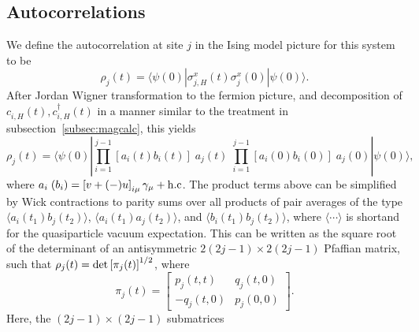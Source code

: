 \documentclass[a4paper,10pt]{article}
\begin{document}
\subsection{Autocorrelations}
\label{subsec:corrcalc}
We define the autocorrelation at site $j$ in the Ising model picture for this system to be
\begin{equation}
\label{eq:corrdef}
\rho_j(t) = \langle \psi(0) | \sigma^x_{j,H} (t) \sigma^x_{j}(0) |\psi(0)\rangle.
\end{equation}
After Jordan Wigner transformation to the fermion picture, and decomposition of $c^{\;}_{i,H}(t), c^\dagger_{i,H}(t)$ in a manner similar to the treatment in subsection~\ref{subsec:magcalc}, this yields
\begin{equation}
\rho_j(t) = \langle \psi(0) | \prod^{j-1}_{i=1}\left[a_i(t)b_i(t)\right]\;a_j(t)\;  \prod^{j-1}_{i=1}\left[a_i(0)b_i(0)\right]\; a_j(0)|\psi(0)\rangle,
\end{equation}
where $a_i\; (b_i) = \left[v + (-) u\right]_{i\mu}\gamma_\mu + {\rm h.c}$. The product terms above can be simplified by Wick contractions to parity sums over all products of pair averages of the type $\langle a_i(t_1) b_j(t_2) \rangle$, $\langle a_i(t_1) a_j(t_2) \rangle$, and $\langle b_i(t_1) b_j(t_2) \rangle$, where $\langle \cdots\rangle$ is shortand for the quasiparticle vacuum expectation. This can be written as the square root of the determinant of an antisymmetric  $2(2j-1)\times 2(2j-1)$
Pfaffian matrix, such that $\rho_j(t)={\rm det}\left[\pi_j(t)\right]^{1/2}$, where
\begin{equation}
\label{eq:pfaffian}
\pi_j(t) = \begin{bmatrix}
            p_j(t,t) & q_j(t,0) \\
            -q_j(t,0) & p_j(0,0)
           \end{bmatrix}.
\end{equation}
Here, the $(2j-1)\times (2j-1)$ submatrices
\end{document}
